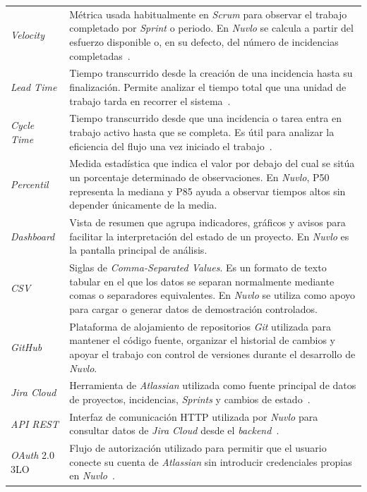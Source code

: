 {\begin{longtable}{p{3.2cm}p{9.2cm}}
\textit{Velocity} & Métrica usada habitualmente en \textit{Scrum} para observar el trabajo completado por \textit{Sprint} o periodo. En \textit{Nuvlo} se calcula a partir del esfuerzo disponible o, en su defecto, del número de incidencias completadas~\cite{ScrumGuide2020}. \\
\textit{Lead Time} & Tiempo transcurrido desde la creación de una incidencia hasta su finalización. Permite analizar el tiempo total que una unidad de trabajo tarda en recorrer el sistema~\cite{Anderson2010Kanban}. \\
\textit{Cycle Time} & Tiempo transcurrido desde que una incidencia o tarea entra en trabajo activo hasta que se completa. Es útil para analizar la eficiencia del flujo una vez iniciado el trabajo~\cite{Anderson2010Kanban}. \\
\textit{Percentil} & Medida estadística que indica el valor por debajo del cual se sitúa un porcentaje determinado de observaciones. En \textit{Nuvlo}, P50 representa la mediana y P85 ayuda a observar tiempos altos sin depender únicamente de la media. \\
\textit{Dashboard} & Vista de resumen que agrupa indicadores, gráficos y avisos para facilitar la interpretación del estado de un proyecto. En \textit{Nuvlo} es la pantalla principal de análisis. \\
\textit{CSV} & Siglas de \textit{Comma-Separated Values}. Es un formato de texto tabular en el que los datos se separan normalmente mediante comas o separadores equivalentes. En \textit{Nuvlo} se utiliza como apoyo para cargar o generar datos de demostración controlados. \\
\textit{GitHub} & Plataforma de alojamiento de repositorios \textit{Git} utilizada para mantener el código fuente, organizar el historial de cambios y apoyar el trabajo con control de versiones durante el desarrollo de \textit{Nuvlo}. \\
\textit{Jira Cloud} & Herramienta de \textit{Atlassian} utilizada como fuente principal de datos de proyectos, incidencias, \textit{Sprints} y cambios de estado~\cite{AtlassianJira,AtlassianJiraRestV3}. \\
\textit{API REST} & Interfaz de comunicación HTTP utilizada por \textit{Nuvlo} para consultar datos de \textit{Jira Cloud} desde el \textit{backend}~\cite{AtlassianJiraRestV3}. \\
\textit{OAuth} 2.0 3LO & Flujo de autorización utilizado para permitir que el usuario conecte su cuenta de \textit{Atlassian} sin introducir credenciales propias en \textit{Nuvlo}~\cite{AtlassianOAuth3LO,OWASPOAuth2}. \\

\end{longtable}}

